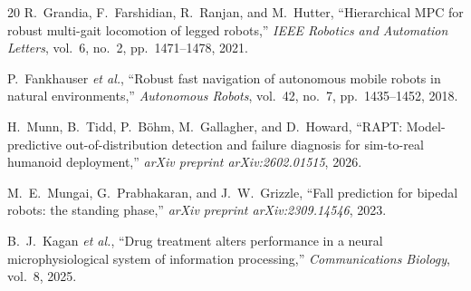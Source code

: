 \begin{thebibliography}{20}
R.~Grandia, F.~Farshidian, R.~Ranjan, and M.~Hutter, ``Hierarchical MPC for
robust multi-gait locomotion of legged robots,'' \emph{IEEE Robotics and
Automation Letters}, vol.~6, no.~2, pp.~1471--1478, 2021.

P.~Fankhauser \emph{et al.}, ``Robust fast navigation of autonomous mobile
robots in natural environments,'' \emph{Autonomous Robots}, vol.~42, no.~7,
pp.~1435--1452, 2018.

H.~Munn, B.~Tidd, P.~B\"ohm, M.~Gallagher, and D.~Howard, ``RAPT:
Model-predictive out-of-distribution detection and failure diagnosis for
sim-to-real humanoid deployment,'' \emph{arXiv preprint arXiv:2602.01515},
2026.

M.~E.~Mungai, G.~Prabhakaran, and J.~W.~Grizzle, ``Fall prediction for
bipedal robots: the standing phase,'' \emph{arXiv preprint
arXiv:2309.14546}, 2023.

B.~J.~Kagan \emph{et al.}, ``Drug treatment alters performance in a neural
microphysiological system of information processing,'' \emph{Communications
Biology}, vol.~8, 2025.

\end{thebibliography}


